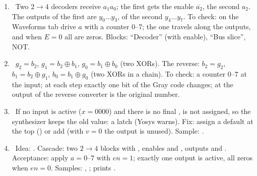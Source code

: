 \begin{enumerate}
  \item {}~Two $2\to4$ decoders receive $a_1a_0$; the first gets the enable $\overline{a_2}$, the second $a_2$. The outputs of the first are $y_0\ldots y_3$, of the second $y_4\ldots y_7$. To check: on the Waveforms tab drive $a$ with a counter $0$--$7$; the one travels along the outputs, and when $E=0$ all are zeros. Blocks: ``Decoder'' (with enable), ``Bus slice'', NOT.
  \item {}~$g_2=b_2$, $g_1=b_2\oplus b_1$, $g_0=b_1\oplus b_0$ (two XORs). The reverse: $b_2=g_2$, $b_1=b_2\oplus g_1$, $b_0=b_1\oplus g_0$ (two XORs in a chain). To check: a counter $0$--$7$ at the input; at each step exactly one bit of the Gray code changes; at the output of the reverse converter is the original number.
  \item {}~If no input is active ($x=0000$) and there is no final ,  is not assigned, so the synthesizer keeps the old value: a latch (Yosys warns). Fix: assign a default at the top () or add  (with $v=0$ the output is unused). Sample: .
  \item {}~Idea: . Cascade: two $2\to4$ blocks with , enables  and , outputs  and . Acceptance: apply $a=0$--$7$ with $en=1$; exactly one output is active, all zeros when $en=0$. Samples: , ;  prints .
\end{enumerate}

